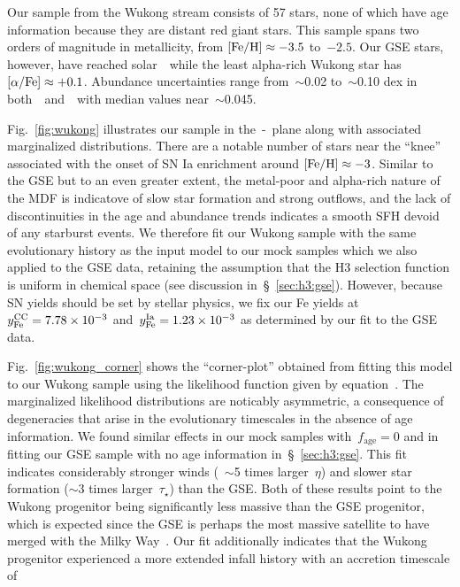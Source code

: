\documentclass[ms.tex]{subfiles}
\begin{document}
Our sample from the Wukong stream consists of 57 stars, none of which have age
information because they are distant red giant stars.
This sample spans two orders of magnitude in metallicity, from
$\text{[Fe/H]} \approx -3.5$ to~$-2.5$.
Our GSE stars, however, have reached solar~\afe~while the least alpha-rich
Wukong star has~$\text{[$\alpha$/Fe]} \approx +0.1$.
Abundance uncertainties range from~$\sim$0.02 to~$\sim$0.10 dex in
both~\afe~and~\feh~with median values near~$\sim$0.045.
\par
Fig.~\ref{fig:wukong} illustrates our sample in the~\afe-\feh~plane along with
associated marginalized distributions. There are a notable number of stars near
the ``knee'' associated with the onset of SN Ia enrichment around
$\text{[Fe/H]} \approx -3$.
Similar to the GSE but to an even greater extent, the metal-poor and alpha-rich
nature of the MDF is indicatove of slow star formation and strong outflows, and
the lack of discontinuities in the age and abundance trends indicates a smooth
SFH devoid of any starburst events.
We therefore fit our Wukong sample with the same evolutionary history as the
input model to our mock samples which we also applied to the GSE data,
retaining the assumption that the H3 selection function is uniform in chemical
space (see discussion in~\S~\ref{sec:h3:gse}).
However, because SN yields should be set by stellar physics, we fix our Fe
yields at~$y_\text{Fe}^\text{CC} = 7.78\times10^{-3}$ and~$y_\text{Fe}^\text{Ia} = 1.23\times10^{-3}$ as
determined by our fit to the GSE data.
\par
Fig.~\ref{fig:wukong_corner} shows the ``corner-plot'' obtained from fitting
this model to our Wukong sample using the likelihood function given by
equation~.
The marginalized likelihood distributions are noticably asymmetric, a
consequence of degeneracies that arise in the evolutionary timescales in the
absence of age information.
We found similar effects in our mock samples with~$f_\text{age} = 0$ and in
fitting our GSE sample with no age information in~\S~\ref{sec:h3:gse}.
This fit indicates considerably stronger winds (~$\sim$5 times larger~$\eta$)
and slower star formation ($\sim$3 times larger~$\tau_\star$) than the GSE.
Both of these results point to the Wukong progenitor being significantly less
massive than the GSE progenitor, which is expected since the GSE is perhaps the
most massive satellite to have merged with the Milky Way~\citep{Deason2019,
Fattahi2019, Mackereth2019, Vincenzo2019}.
Our fit additionally indicates that the Wukong progenitor experienced a more
extended infall history with an accretion timescale of
\end{document}
